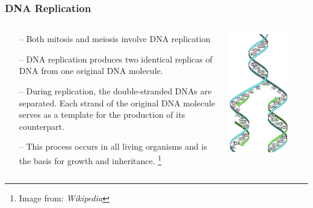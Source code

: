 \documentclass{beamer}
\newcommand\blfootnote[1]{%
	\begingroup
	\renewcommand\thefootnote{}\footnote{#1}%
	\addtocounter{footnote}{-1}%
	\endgroup
}
\begin{document}
	\begin{frame}
		\frametitle{DNA Replication}
		\begin{columns}
\begin{column}{0.6\textwidth}
\begin{itemize}
	\item[--] Both mitosis and meiosis involve DNA replication
	\item[--] DNA replication produces two identical replicas of DNA from one original DNA molecule. 
\item[--] During replication, the double-stranded DNAs are separated. Each strand of the original DNA molecule serves as a template for the production of its counterpart.
\item[--]This process occurs in all living organisms and is the basis for growth and inheritance. 	
\blfootnote{Image from: \textit{Wikipedia}}
\end{itemize}		
\end{column}			
		\begin{column}{0.5\textwidth}
			\centering \includegraphics[keepaspectratio, width  =0.75\textwidth]{img/DNA_replication} 
		\end{column}
		\end{columns}
	\end{frame}
	
\end{document}
